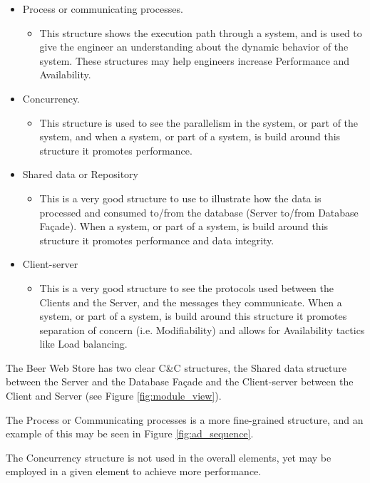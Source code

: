 \begin{itemize}
  \item Process or communicating processes.
	\begin{itemize}
	  \item This structure shows the execution path through a system, and is used to give the engineer an understanding about the dynamic behavior of the system. These structures may help engineers increase Performance and Availability.
	\end{itemize}
  \item Concurrency.
	\begin{itemize}
	  \item This structure is used to see the parallelism in the system, or part of the system, and when a system, or part of a system, is build around this structure it promotes performance. 
	\end{itemize}
  \item Shared data or Repository
	\begin{itemize}
	  \item This is a very good structure to use to illustrate how the data is processed and consumed to/from the database (Server to/from Database Fa\c cade). When a system, or part of a system, is build around this structure it promotes performance and data integrity. 
	\end{itemize}
  \item Client-server
	\begin{itemize}
  		\item This is a very good structure to see the protocols used between the Clients and the Server, and the messages they communicate. When a system, or part of a system, is build around this structure it promotes separation of concern (i.e. Modifiability) and allows for Availability tactics like Load balancing.
	\end{itemize}
\end{itemize}

The Beer Web Store has two clear C\&C structures, the Shared data structure between the Server and the Database Fa\c cade and the Client-server between the Client and Server (see Figure \ref{fig:module_view}).

The Process or Communicating processes is a more fine-grained structure, and an example of this may be seen in Figure \ref{fig:ad_sequence}.

The Concurrency structure is not used in the overall elements, yet may be employed in a given element to achieve more performance.

